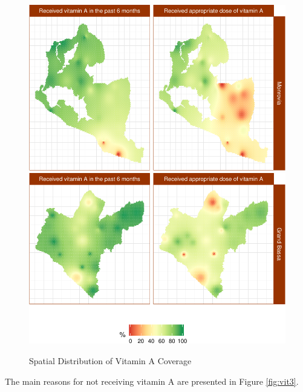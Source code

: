 \documentclass[12pt,a4paper]{article}
\theoremstyle{definition}
\theoremstyle{definition}
\theoremstyle{definition}
\theoremstyle{remark}
\begin{document}
\begin{figure}[H]

{\centering \includegraphics{liberiaCoverageReport_files/figure-latex/vitMap-1} \includegraphics{liberiaCoverageReport_files/figure-latex/vitMap-2} 

}

\caption{Spatial Distribution of Vitamin A Coverage}\label{fig:vitMap}
\end{figure}

The main reasons for not receiving vitamin A are presented in Figure
\ref{fig:vit3}.
\end{document}
